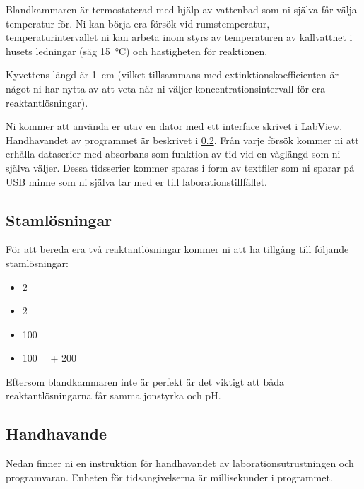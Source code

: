 Blandkammaren är termostaterad med hjälp av vattenbad som ni själva får
välja temperatur för. Ni kan börja era försök vid
rumstemperatur, temperaturintervallet ni kan arbeta inom styrs av
temperaturen av kallvattnet i husets ledningar (säg \SI{15}{\celsius})
och hastigheten för reaktionen. 

Kyvettens längd är \SI{1}{\centi\metre} (vilket
tillsammans med extinktionskoefficienten  är något ni har nytta av att
veta när ni väljer koncentrationsintervall för era reaktantlösningar).

Ni kommer att använda er utav en dator med ett interface
skrivet i LabView. Handhavandet av programmet är beskrivet i
\cref{sec:handhavande}. Från varje försök kommer ni att erhålla dataserier med
absorbans som funktion av tid vid en våglängd som ni själva väljer. Dessa
tidsserier kommer sparas i form av textfiler som ni sparar på USB minne
som ni själva tar med er till laborationstillfället.

\subsection{Stamlösningar}
För att bereda era två reaktantlösningar kommer ni att ha tillgång till följande
stamlösningar:

\begin{itemize}
\item \SI{2}{\Molar} 
\item \SI{2}{\Molar} 
\item \SI{100}{\milli\Molar} 
\item \SI{100}{\milli\Molar}  + \SI{200}{\milli\Molar} 
\end{itemize}

Eftersom blandkammaren inte är perfekt är det viktigt att båda
reaktantlösningarna får samma jonstyrka och pH.

\subsection{Handhavande}
\label{sec:handhavande}
Nedan finner ni en instruktion för handhavandet av
laborationsutrustningen och programvaran. Enheten för tidsangivelserna är
millisekunder i programmet.

